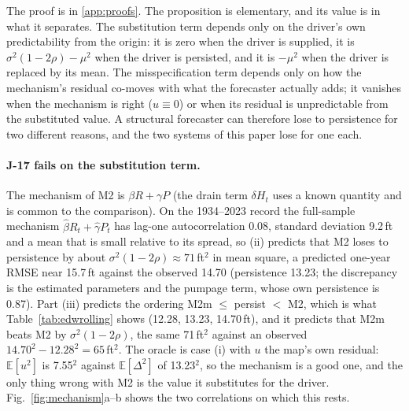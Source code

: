 \documentclass[preprint,11pt,authoryear]{elsarticle}
\theoremstyle{definition}
\theoremstyle{remark}
\newcommand{\E}{\mathbb{E}}
\begin{document}
The proof is in \ref{app:proofs}. The proposition is elementary, and its value is in what it separates. The substitution term depends only on the driver's own predictability from the origin: it is zero when the driver is supplied, it is $\sigma^2(1-2\rho)-\mu^2$ when the driver is persisted, and it is $-\mu^2$ when the driver is replaced by its mean. The misspecification term depends only on how the mechanism's residual co-moves with what the forecaster actually adds; it vanishes when the mechanism is right ($u\equiv0$) or when its residual is unpredictable from the substituted value. A structural forecaster can therefore lose to persistence for two different reasons, and the two systems of this paper lose for one each.

\paragraph{J-17 fails on the substitution term.} The mechanism of M2 is $\beta R+\gamma P$ (the drain term $\delta H_t$ uses a known quantity and is common to the comparison). On the 1934--2023 record the full-sample mechanism $\hat\beta R_t+\hat\gamma P_t$ has lag-one autocorrelation 0.08, standard deviation 9.2\,ft and a mean that is small relative to its spread, so (ii) predicts that M2 loses to persistence by about $\sigma^2(1-2\rho)\approx 71$\,ft$^2$ in mean square, a predicted one-year RMSE near 15.7\,ft against the observed 14.70 (persistence 13.23; the discrepancy is the estimated parameters and the pumpage term, whose own persistence is 0.87). Part (iii) predicts the ordering M2m $\le$ persist $<$ M2, which is what Table~\ref{tab:edwrolling} shows (12.28, 13.23, 14.70\,ft), and it predicts that M2m beats M2 by $\sigma^2(1-2\rho)$, the same 71\,ft$^2$ against an observed $14.70^2-12.28^2=65$\,ft$^2$. The oracle is case (i) with $u$ the map's own residual: $\E[u^2]$ is 7.55$^2$ against $\E[\Delta^2]$ of 13.23$^2$, so the mechanism is a good one, and the only thing wrong with M2 is the value it substitutes for the driver. Fig.~\ref{fig:mechanism}a--b shows the two correlations on which this rests.
\end{document}

